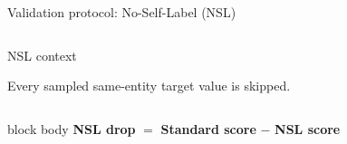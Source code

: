 \documentclass[aspectratio=169,10pt,t]{beamer}
\begin{document}
\begin{frame}{Validation protocol: No-Self-Label (NSL)}
\begin{columns}[T,onlytextwidth]
\begin{alertblock}{NSL context}
        \vspace{.08cm}
        \raggedright\scriptsize
        Every sampled same-entity target value is skipped.
      \end{alertblock}
  \end{columns}

  \vspace{.10cm}
  \begin{beamercolorbox}[sep=.34em,wd=\linewidth]{block body}
    \centering
    \textbf{NSL drop} $=$ \textbf{Standard score} $-$ \textbf{NSL score}
  \end{beamercolorbox}

\end{frame}


\end{document}
